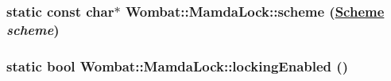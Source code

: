 \hypertarget{classWombat_1_1MamdaLock_c622986074209cfe944e3d163a5538e7}{
\subsubsection[scheme]{\setlength{\rightskip}{0pt plus 5cm}static const char$\ast$ Wombat::Mamda\-Lock::scheme (\hyperlink{classWombat_1_1MamdaLock_87d4e5bd1d3db6a91d9f769315bfd32e}{Scheme} {\em scheme})}}
\label{classWombat_1_1MamdaLock_c622986074209cfe944e3d163a5538e7}


\hypertarget{classWombat_1_1MamdaLock_9e49f016c806144085a104b8bc490894}{
\subsubsection[lockingEnabled]{\setlength{\rightskip}{0pt plus 5cm}static bool Wombat::Mamda\-Lock::locking\-Enabled ()}}
\label{classWombat_1_1MamdaLock_9e49f016c806144085a104b8bc490894}


